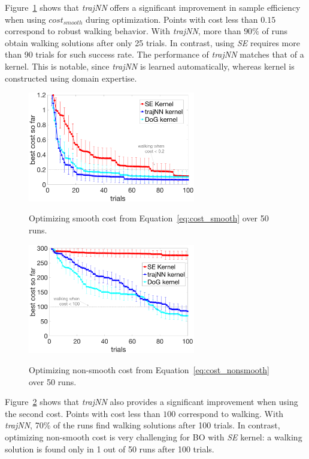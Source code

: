 Figure~\ref{fig:smooth_cost_bo_runs} shows that \textit{trajNN} offers a significant improvement in sample efficiency when using $cost_{smooth}$ during optimization. Points with cost less than $0.15$ correspond to robust walking behavior. With \textit{trajNN}, more than $90\%$ of runs obtain walking solutions after only 25 trials. In contrast, using \textit{SE} requires more than 90 trials for such success rate. The performance of \textit{trajNN} matches that of a \dogkernel kernel. This is notable, since \textit{trajNN} is learned automatically, whereas \dogkernel kernel is constructed using domain expertise.


\begin{figure}[t]
\centering
\caption{Optimizing smooth cost from Equation~\ref{eq:cost_smooth} over 50 runs.}
\includegraphics[width=0.65\textwidth]{img/smooth_cost_bo_runs}
\label{fig:smooth_cost_bo_runs}
\end{figure}

\begin{figure}[t]
\centering
\caption{Optimizing non-smooth cost from Equation~\ref{eq:cost_nonsmooth} over 50 runs.}
\includegraphics[width=0.65\textwidth]{img/nonsmooth_cost_bo_runs}
\label{fig:nonsmooth_cost_bo_runs}
\end{figure}

Figure~\ref{fig:nonsmooth_cost_bo_runs} shows that \textit{trajNN} also provides a significant improvement when using the second cost. Points with cost less than $100$ correspond to walking. With \textit{trajNN}, 70\% of the runs find walking solutions after 100 trials. In contrast, optimizing non-smooth cost is very challenging for BO with \textit{SE} kernel: a walking solution is found only in 1 out of 50 runs after 100 trials.

